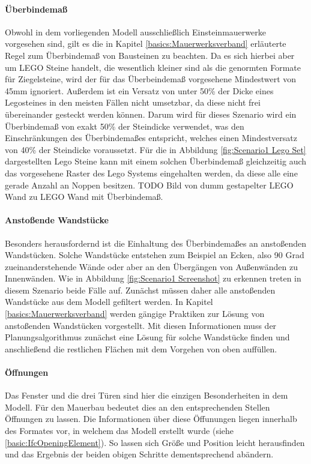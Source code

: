 \paragraph{Überbindemaß}
Obwohl in dem vorliegenden Modell ausschließlich Einsteinmauerwerke vorgesehen sind, gilt es die in Kapitel \ref{basics:Mauerwerksverband} erläuterte Regel zum Überbindemaß von Bausteinen zu beachten.
Da es sich hierbei aber um LEGO Steine handelt, die wesentlich kleiner sind als die genormten Formate für Ziegelsteine, wird der für das Überbeindemaß vorgesehene Mindestwert von 45mm ignoriert.
Außerdem ist ein Versatz von unter 50\% der Dicke eines Legosteines in den meisten Fällen nicht umsetzbar, da diese nicht frei übereinander gesteckt werden können.
Darum wird für dieses Szenario wird ein Überbindemaß von exakt 50\% der Steindicke verwendet, was den Einschränkungen des Überbindemaßes entspricht, welches einen Mindestversatz von 40\% der Steindicke voraussetzt.
Für die in Abbildung \ref{fig:Scenario1 Lego Set} dargestellten Lego Steine kann mit einem solchen Überbindemaß gleichzeitig auch das vorgesehene Raster des Lego Systems eingehalten werden, da diese alle eine gerade Anzahl an Noppen besitzen.
TODO Bild von dumm gestapelter LEGO Wand zu LEGO Wand mit Überbindemaß.

\paragraph{Anstoßende Wandstücke} 
Besonders herausfordernd ist die Einhaltung des Überbindemaßes an anstoßenden Wandstücken.
Solche Wandstücke entstehen zum Beispiel an Ecken, also 90 Grad zueinanderstehende Wände oder aber an den Übergängen von Außenwänden zu Innenwänden.
Wie in Abbildung \ref{fig:Scenario1 Screenshot} zu erkennen treten in diesem Szenario beide Fälle auf.
Zunächst müssen daher alle anstoßenden Wandstücke aus dem Modell gefiltert werden.
In Kapitel \ref{basics:Mauerwerksverband} werden gängige Praktiken zur Lösung von anstoßenden Wandstücken vorgestellt.
Mit diesen Informationen muss der Planungsalgorithmus zunächst eine Lösung für solche Wandstücke finden und anschließend die restlichen Flächen mit dem Vorgehen von oben auffüllen.

\paragraph{Öffnungen}
Das Fenster und die drei Türen sind hier die einzigen Besonderheiten in dem Modell.
Für den Mauerbau bedeutet dies an den entsprechenden Stellen Öffnungen zu lassen.
Die Informationen über diese Öffunungen liegen innerhalb des Formates vor, in welchem das Modell erstellt wurde (siehe \ref{basic:IfcOpeningElement}).
So lassen sich Größe und Position leicht herausfinden und das Ergebnis der beiden obigen Schritte dementsprechend abändern.

